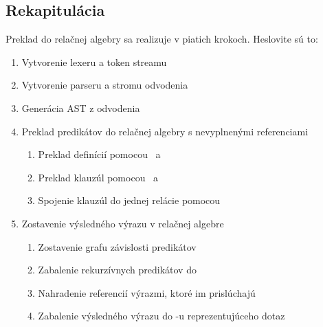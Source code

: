 \subsection*{Rekapitulácia}
Preklad do relačnej algebry sa realizuje v piatich krokoch. Heslovite sú to:
\begin{enumerate}
    \item Vytvorenie lexeru a token streamu
    \item Vytvorenie parseru a stromu odvodenia
    \item Generácia AST z odvodenia
    \item Preklad predikátov do relačnej algebry s nevyplnenými referenciami
    \begin{enumerate}
        \item Preklad definícií pomocou \JOIN\ a \UNION\
        \item Preklad klauzúl pomocou \JOIN\ a \ANTIJOIN\
        \item Spojenie klauzúl do jednej relácie pomocou \UNION\
    \end{enumerate}
    \item Zostavenie výsledného výrazu v relačnej algebre
    \begin{enumerate}
        \item Zostavenie grafu závislosti predikátov
        \item Zabalenie rekurzívnych predikátov do \REC\
        \item Nahradenie referencií výrazmi, ktoré im prislúchajú
        \item Zabalenie výsledného výrazu do \JOIN-u reprezentujúceho dotaz
    \end{enumerate}
\end{enumerate}